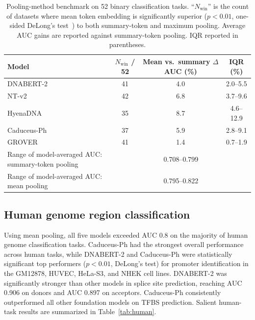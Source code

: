 \documentclass[11pt,a4paper]{article}
\begin{document}
\begin{table}[t]
\centering
\caption{Pooling-method benchmark on 52 binary classification tasks. ``$N_\text{win}$'' is the count of datasets where mean token embedding is significantly superior ($p<0.01$, one-sided DeLong's test~\citep{delong1988comparing}) to both summary-token and maximum pooling. Average AUC gains are reported against summary-token pooling. IQR reported in parentheses.}
\label{tab:pooling}
\begin{tabular}{lccc}
\toprule
Model & $N_\text{win}$ / 52 & Mean vs.\ summary $\Delta$AUC (\%) & IQR (\%) \\
\midrule
DNABERT-2    & 41 & 4.0 & 2.0--5.5 \\
NT-v2        & 42 & 6.8 & 3.7--9.6 \\
HyenaDNA     & 35 & 8.7 & 4.6--12.9 \\
Caduceus-Ph  & 37 & 5.9 & 2.8--9.1 \\
GROVER       & 41 & 1.4 & 0.7--1.9 \\
\midrule
Range of model-averaged AUC: summary-token pooling & \multicolumn{3}{c}{0.708--0.799} \\
Range of model-averaged AUC: mean pooling          & \multicolumn{3}{c}{0.795--0.822} \\
\bottomrule
\end{tabular}
\end{table}

\subsection{Human genome region classification}
Using mean pooling, all five models exceeded AUC 0.8 on the majority of human genome classification tasks. Caduceus-Ph had the strongest overall performance across human tasks, while DNABERT-2 and Caduceus-Ph were statistically significant top performers ($p<0.01$, DeLong's test) for promoter identification in the GM12878, HUVEC, HeLa-S3, and NHEK cell lines. DNABERT-2 was significantly stronger than other models in splice site prediction, reaching AUC 0.906 on donors and AUC 0.897 on acceptors. Caduceus-Ph consistently outperformed all other foundation models on TFBS prediction. Salient human-task results are summarized in Table~\ref{tab:human}.
\end{document}

